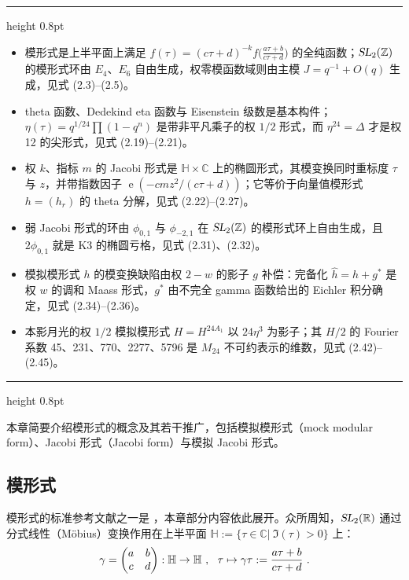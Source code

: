 \documentclass[11pt,a4paper,fontset=windows]{ctexart}
\numberwithin{equation}{section}
\newenvironment{keytakeaways}
  {\par\medskip\noindent
   \begin{minipage}{\linewidth}
   \hrule height 0.8pt\smallskip
   \noindent{\bfseries 本节重点（Key Takeaways）}\par\smallskip
   \begin{itemize}[leftmargin=1.6em,itemsep=2pt,topsep=1pt,parsep=0pt,partopsep=0pt]}
  {\end{itemize}\smallskip\hrule height 0.8pt\end{minipage}%
   \par\medskip}
\newcommand{\PSL}{\operatorname{\textsl{PSL}}}    %
\newcommand{\SL}{\operatorname{\textsl{SL}}}      %
\newcommand{\CC}{\mathbb{C}}
\newcommand{\RR}{\mathbb{R}}
\newcommand{\HH}{\mathbb{H}}
\newcommand{\ZZ}{\mathbb{Z}}
\def\t{\tau}
\newcommand{\ex}{\operatorname{e}} %
\newcommand{\be}{\begin{equation}}
\newcommand{\ee}{\end{equation}}
\begin{document}
\begin{keytakeaways}
  \item 模形式是上半平面上满足 $f(\t)=(c\t+d)^{-k}f\big(\frac{a\t+b}{c\t+d}\big)$ 的全纯函数；$\SL_2(\ZZ)$ 的模形式环由 $E_4$、$E_6$ 自由生成，权零模函数域则由主模 $J=q^{-1}+O(q)$ 生成，见式 (2.3)--(2.5)。
  \item theta 函数、Dedekind eta 函数与 Eisenstein 级数是基本构件；$\eta(\t)=q^{1/24}\prod(1-q^n)$ 是带非平凡乘子的权 $1/2$ 形式，而 $\eta^{24}=\Delta$ 才是权 12 的尖形式，见式 (2.19)--(2.21)。
  \item 权 $k$、指标 $m$ 的 Jacobi 形式是 $\HH\times\CC$ 上的椭圆形式，其模变换同时重标度 $\t$ 与 $z$，并带指数因子 $\ex(-cmz^2/(c\t+d))$；它等价于向量值模形式 $h=(h_r)$ 的 theta 分解，见式 (2.22)--(2.27)。
  \item 弱 Jacobi 形式的环由 $\phi_{0,1}$ 与 $\phi_{-2,1}$ 在 $\SL_2(\ZZ)$ 的模形式环上自由生成，且 $2\phi_{0,1}$ 就是 K3 的椭圆亏格，见式 (2.31)、(2.32)。
  \item 模拟模形式 $h$ 的模变换缺陷由权 $2-w$ 的影子 $g$ 补偿：完备化 $\hat h=h+g^\ast$ 是权 $w$ 的调和 Maass 形式，$g^\ast$ 由不完全 gamma 函数给出的 Eichler 积分确定，见式 (2.34)--(2.36)。
  \item 本影月光的权 $1/2$ 模拟模形式 $H=H^{24A_1}$ 以 $24\eta^3$ 为影子；其 $H/2$ 的 Fourier 系数 45、231、770、2277、5796 是 $M_{24}$ 不可约表示的维数，见式 (2.42)--(2.45)。
\end{keytakeaways}

本章简要介绍模形式的概念及其若干推广，包括模拟模形式（mock modular form）、Jacobi 形式（Jacobi form）与模拟 Jacobi 形式。

\subsection{模形式}
\label{subsec:modular_forms}

模形式的标准参考文献之一是 \cite{2008T1om}，本章部分内容依此展开。众所周知，$\SL_2(\RR)$ 通过分式线性（Möbius）变换作用在上半平面 $\HH:=\{\t\in \CC\lvert~ \Im(\t) > 0\}$ 上：
\be
\gamma = \begin{pmatrix} a &b \\ c&d\end{pmatrix} : \HH \to \HH~,~~ \t \mapsto \gamma\t := {a\t+b\over c\t+d}~. 
\ee

\end{document}
